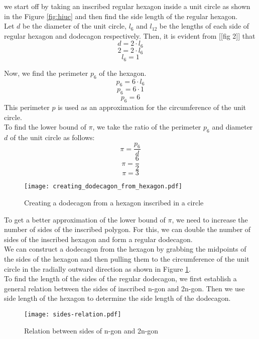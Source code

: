 \documentclass[12pt]{article}
\begin{document}
we start off by taking an inscribed regular hexagon inside a unit circle as shown in the Figure \ref{fig:hiuc} and then find the side length of the regular hexagon. \\

Let $d$ be the diameter of the unit circle, $l_{6}$ and $l_{12}$ be the lengths of each side of regular hexagon and dodecagon respectively.
Then, it is evident from [[fig 2]] that\\
$$d = 2 \cdot l_{6}$$
$$2 = 2 \cdot l_{6}$$
$$l_{6} = 1$$
\bigskip

Now, we find the perimeter $p_{6}$ of the hexagon.\\
$$p_{6} = 6 \cdot l_{6}$$
$$p_{6} = 6 \cdot 1$$
$$p_{6} = 6$$
This perimeter $p$ is used as an approximation for the circumference of the unit circle.\\

To find the lower bound of $\pi$, we take the ratio of the perimeter $p_{6}$ and diameter $d$ of the unit circle as follows:\\
$$\pi = \frac{p_{6}}{d}$$
$$\pi = \frac{6}{2}$$
$$\pi = 3$$

\begin{figure}[h!]
  \texttt{[image: creating\_dodecagon\_from\_hexagon.pdf]}
  \caption{Creating a dodecagon from a hexagon inscribed in a circle}
  \label{fig:creating dodecagons}
\end{figure}

\bigskip
\bigskip
\bigskip
\bigskip
\bigskip
To get a better approximation of the lower bound of $\pi$, we need to increase the number of sides of the inscribed polygon. For this, we can double the number of sides of the inscribed hexagon and form a regular dodecagon. \\


We can construct a dodecagon from the hexagon by grabbing the midpoints of the sides of the hexagon and then pulling them to the circumference of the unit circle in the radially outward direction as shown in Figure \ref{fig:creating dodecagons}. \\


To find the length of the sides of the regular dodecagon, we first establish a
general relation between the sides of inscribed n-gon and 2n-gon. Then we use side length
of the hexagon to determine the side length of the dodecagon.

\begin{figure}[h!]
  \texttt{[image: sides-relation.pdf]}
  \caption{Relation between sides of n-gon and 2n-gon}
  \label{fig:sides relation}
\end{figure}
\end{document}

